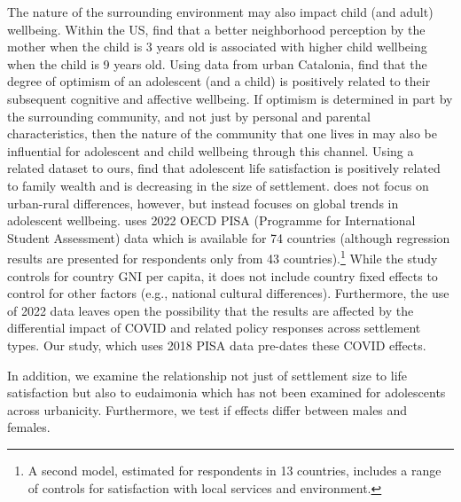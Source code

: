 \documentclass[10pt, letterpaper]{article}
\begin{document}
\begin{spacing}{1.4}
The nature of the surrounding environment may also impact child (and adult) wellbeing. Within the US, \citet{fava2022} find that a better neighborhood perception by the mother when the child is 3 years old is associated with higher child wellbeing when the child is 9 years old. Using data from urban Catalonia, \citet{oriol2023} find that the degree of optimism of an adolescent (and a child) is positively related to their subsequent cognitive and affective wellbeing. If optimism is determined in part by the surrounding community, and not just by personal and parental characteristics, then the nature of the community that one lives in may also be influential for adolescent and child wellbeing through this channel. 
Using a related dataset to ours, \citet{marquez24} find that adolescent life satisfaction is positively
related to family wealth and is decreasing in the size of
settlement. \citet{marquez24} does not focus on urban-rural differences,
however, but instead focuses on global trends in adolescent wellbeing.  
 \citet{marquez24} uses 2022 OECD PISA (Programme for
International Student Assessment) data which is available for 74 countries (although regression results are
presented for respondents only from 43 countries).\footnote{A second model, estimated for respondents in 13 countries, includes a range of controls
  for satisfaction with local services and environment.}
While the study controls for country GNI per capita, it does
not include country fixed effects to control for other factors (e.g., national cultural differences). Furthermore,
the use of 2022 data leaves open the possibility that the results are affected by the differential impact of COVID
and related policy responses across settlement types.
Our study, which uses 2018 PISA data pre-dates these COVID effects.

In addition,
we examine the relationship not just of settlement size to life satisfaction but
also to eudaimonia which has not been examined for adolescents across
urbanicity. Furthermore, we test if effects differ between males and
females. %


\end{spacing}
\end{document}
